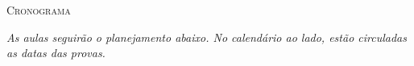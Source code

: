 \thispagestyle{plain}
\begin{fullwidth}
\begin{center}
{\noindent\LARGE\textsc{Cronograma}} \\
\end{center}
\end{fullwidth}

\vspace{1cm}
\begin{fullwidth}
\it
As aulas seguirão o planejamento abaixo. No calendário ao lado, estão circuladas as datas das provas.
\end{fullwidth}


